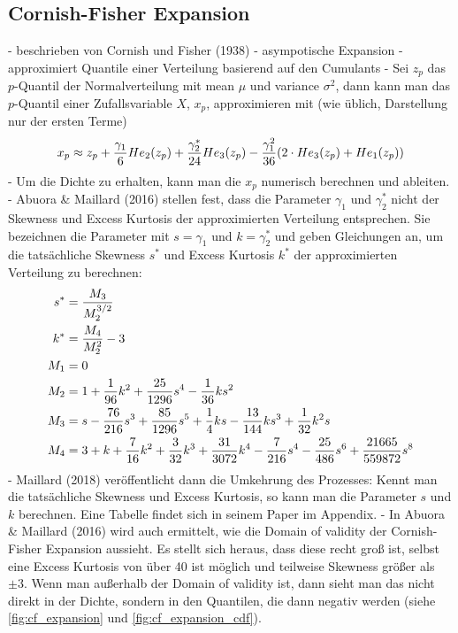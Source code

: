 \subsection{Cornish-Fisher Expansion}

- beschrieben von Cornish und Fisher (1938)
- asympotische Expansion
- approximiert Quantile einer Verteilung basierend auf den Cumulants
- Sei $z_p$ das $p$-Quantil der Normalverteilung mit mean $\mu$ und variance $\sigma^2$, dann kann man das $p$-Quantil einer Zufallsvariable $X$, $x_p$, approximieren mit (wie üblich, Darstellung nur der ersten Terme)
\begin{align}
    x_p \approx z_p + \frac{\gamma_1}{6}He_2(z_p) + \frac{\gamma_2^*}{24}He_3(z_p) - \frac{\gamma_1^2}{36}(2\cdot He_3(z_p) + He_1(z_p)) \notag
\end{align}
- Um die Dichte zu erhalten, kann man die $x_p$ numerisch berechnen und ableiten.
- Abuora & Maillard (2016) stellen fest, dass die Parameter $\gamma_1$ und $\gamma_2^*$ nicht der Skewness und Excess Kurtosis der approximierten Verteilung entsprechen. Sie bezeichnen die Parameter mit $s = \gamma_1$ und $k = \gamma_2^*$ und geben Gleichungen an, um die tatsächliche Skewness $s^*$ und Excess Kurtosis $k^*$ der approximierten Verteilung zu berechnen:
\begin{align}
    s^* &= \frac{M_3}{M_{2}^{3/2}} \notag \\
    k^* &= \frac{M_4}{M_{2}^2} - 3 \notag \\
    M_1 &= 0 \\
    M_2 &= 1 + \frac{1}{96}k^2 + \frac{25}{1296}s^4 - \frac{1}{36}ks^2 \\
    M_3 &= s - \frac{76}{216}s^3 + \frac{85}{1296}s^5 + \frac{1}{4}ks - \frac{13}{144}ks^3 + \frac{1}{32}k^2s \\
    M_4 &= 3 + k + \frac{7}{16}k^2 + \frac{3}{32}k^3 + \frac{31}{3072}k^4 - \frac{7}{216}s^4 - \frac{25}{486}s^6 + \frac{21665}{559872}s^8 \notag
\end{align}
- Maillard (2018) veröffentlicht dann die Umkehrung des Prozesses: Kennt man die tatsächliche Skewness und Excess Kurtosis, so kann man die Parameter $s$ und $k$ berechnen. Eine Tabelle findet sich in seinem Paper im Appendix.
- In Abuora & Maillard (2016) wird auch ermittelt, wie die Domain of validity der Cornish-Fisher Expansion aussieht. Es stellt sich heraus, dass diese recht groß ist, selbst eine Excess Kurtosis von über 40 ist möglich und teilweise Skewness größer als $\pm 3$. Wenn man außerhalb der Domain of validity ist, dann sieht man das nicht direkt in der Dichte, sondern in den Quantilen, die dann negativ werden (siehe \ref{fig:cf_expansion} und \ref{fig:cf_expansion_cdf}).

